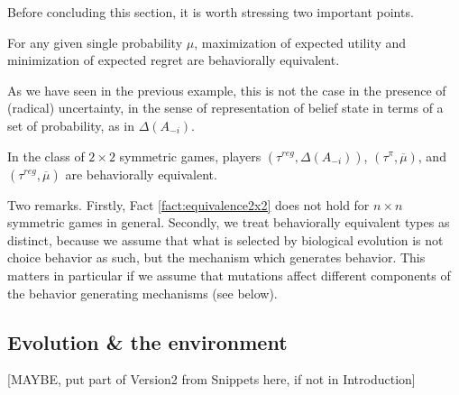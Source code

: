 \documentclass[fleqn,reqno,11pt]{article}
\begin{document}
Before concluding this section, it is worth stressing two important points.

\begin{fact} \label{fact:maxEU-minReg}

For any given single probability $\mu$, maximization of expected utility and minimization of expected regret are behaviorally equivalent.

\end{fact}

\noindent As we have seen in the previous example, this is not the case in the presence of (radical) uncertainty, in the sense of representation of belief state in terms of a set of probability, as in $ \Delta(A_{-i}) $.

\begin{fact} \label{fact:equivalence2x2}

In the class of $2 \times 2$ symmetric games, players $(\tau^{reg}, \Delta(A_{-i}))$, $(\tau^{\pi}, \overline{\mu})$, and $(\tau^{reg},\overline{\mu})$ are behaviorally equivalent.

\end{fact} 

\noindent Two remarks. Firstly, Fact \ref{fact:equivalence2x2} does not hold for $n \times n$
symmetric games in general. Secondly, we treat behaviorally equivalent types as distinct,
because we assume that what is selected by biological evolution is not choice behavior as such,
but the mechanism which generates behavior. This matters in particular if we assume that
mutations affect different components of the behavior generating mechanisms (see below). 



\subsection{Evolution \& the environment}

[MAYBE, put part of Version2 from Snippets here, if not in Introduction]
\end{document}
